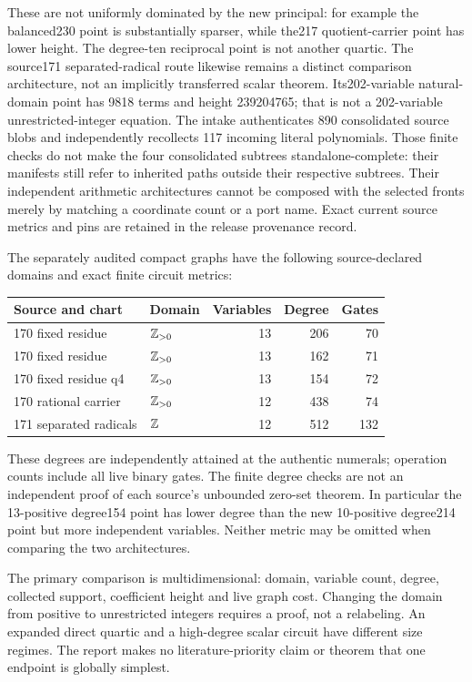 These are not uniformly dominated by the new principal: for example the
balanced230 point is substantially sparser, while the217 quotient-carrier
point has lower height. The degree-ten reciprocal point is not another
quartic. The source171 separated-radical route likewise remains a distinct
comparison architecture, not an implicitly transferred scalar theorem.
Its202-variable natural-domain point has 9818 terms and height 239204765;
that is not a 202-variable unrestricted-integer equation.
The intake authenticates 890 consolidated source blobs and independently
recollects 117 incoming literal polynomials. Those finite checks do not
make the four consolidated subtrees standalone-complete: their manifests
still refer to inherited paths outside their respective subtrees. Their independent arithmetic architectures
cannot be composed with the selected fronts merely by matching a
coordinate count or a port name. Exact current source metrics and pins
are retained in the release provenance record.

The separately audited compact graphs have the following source-declared
domains and exact finite circuit metrics:
\begin{center}\small
\begin{tabular}{@{}llrrr@{}}\toprule
Source and chart & Domain & Variables & Degree & Gates\\\midrule
170 fixed residue & $\mathbb Z_{>0}$ &13&206&70\\
170 fixed residue & $\mathbb Z_{>0}$ &13&162&71\\
170 fixed residue q4 & $\mathbb Z_{>0}$ &13&154&72\\
170 rational carrier & $\mathbb Z_{>0}$ &12&438&74\\
171 separated radicals & $\mathbb Z$ &12&512&132\\\bottomrule
\end{tabular}
\end{center}
These degrees are independently attained at the authentic numerals;
operation counts include all live binary gates. The finite degree checks
are not an independent proof of each source's unbounded zero-set theorem.
In particular the 13-positive degree154 point has lower degree than the
new 10-positive degree214 point but more independent variables. Neither
metric may be omitted when comparing the two architectures.

The primary comparison is multidimensional: domain, variable count,
degree, collected support, coefficient height and live graph cost.
Changing the domain from positive to unrestricted integers requires a
proof, not a relabeling. An expanded direct quartic and a high-degree
scalar circuit have different size regimes. The report makes no
literature-priority claim or theorem that one endpoint is globally simplest.
